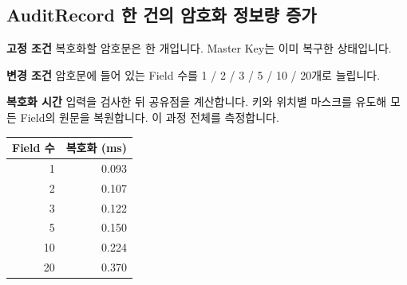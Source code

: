 \documentclass[11pt,a4paper]{article}
\begin{document}
\par\noindent\begin{minipage}{\linewidth}
\subsection*{AuditRecord 한 건의 암호화 정보량 증가}
\textbf{고정 조건}\newline
복호화할 암호문은 한 개입니다.\newline
Master Key는 이미 복구한 상태입니다.\par\smallskip
\textbf{변경 조건}\newline
암호문에 들어 있는 Field 수를 1 / 2 / 3 / 5 / 10 / 20개로 늘립니다.\par\smallskip
\textbf{복호화 시간}\newline
입력을 검사한 뒤 공유점을 계산합니다.\newline
키와 위치별 마스크를 유도해 모든 Field의 원문을 복원합니다.\newline
이 과정 전체를 측정합니다.\par\smallskip
\begin{center}\small\begin{tabular}{@{}rr@{}}\toprule
\textbf{Field 수} & \textbf{복호화 (ms)} \\
\midrule
1 & 0.093 \\
2 & 0.107 \\
3 & 0.122 \\
5 & 0.150 \\
10 & 0.224 \\
20 & 0.370 \\
\bottomrule\end{tabular}\end{center}
\end{minipage}\par\medskip
\end{document}
